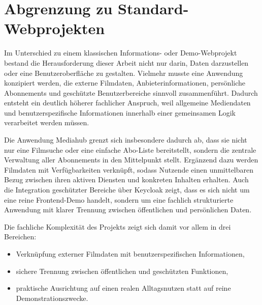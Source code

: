 \section{Abgrenzung zu Standard-Webprojekten}
Im Unterschied zu einem klassischen Informations- oder Demo-Webprojekt bestand die Herausforderung dieser Arbeit nicht nur darin, Daten darzustellen oder eine Benutzeroberfläche zu gestalten. Vielmehr musste eine Anwendung konzipiert werden, die externe Filmdaten, Anbieterinformationen, persönliche Abonnements und geschützte Benutzerbereiche sinnvoll zusammenführt. Dadurch entsteht ein deutlich höherer fachlicher Anspruch, weil allgemeine Mediendaten und benutzerspezifische Informationen innerhalb einer gemeinsamen Logik verarbeitet werden müssen.

Die Anwendung \glqq Mediahub\grqq{} grenzt sich insbesondere dadurch ab, dass sie nicht nur eine Filmsuche oder eine einfache Abo-Liste bereitstellt, sondern die zentrale Verwaltung aller Abonnements in den Mittelpunkt stellt. Ergänzend dazu werden Filmdaten mit Verfügbarkeiten verknüpft, sodass Nutzende einen unmittelbaren Bezug zwischen ihren aktiven Diensten und konkreten Inhalten erhalten. Auch die Integration geschützter Bereiche über Keycloak zeigt, dass es sich nicht um eine reine Frontend-Demo handelt, sondern um eine fachlich strukturierte Anwendung mit klarer Trennung zwischen öffentlichen und persönlichen Daten.

Die fachliche Komplexität des Projekts zeigt sich damit vor allem in drei Bereichen:
\begin{itemize}
    \item Verknüpfung externer Filmdaten mit benutzerspezifischen Informationen,
    \item sichere Trennung zwischen öffentlichen und geschützten Funktionen,
    \item praktische Ausrichtung auf einen realen Alltagsnutzen statt auf reine Demonstrationszwecke.
\end{itemize}
